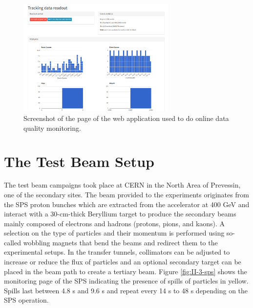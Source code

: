       \begin{figure}[h!]
        \centering
        \includegraphics[width=0.7\textwidth]{img/II-3-test-beam/app-tk.png}
        \caption{Screenshot of the page of the web application used to do online data quality monitoring.}
        \label{fig:II-3-app-tk}
      \end{figure}

  \section{The Test Beam Setup}

    The test beam campaigns took place at CERN in the North Area of Prevessin, one of the secondary sites. The beam provided to the experiments originates from the SPS proton bunches which are extracted from the accelerator at 400 GeV and interact with a 30-cm-thick Beryllium target to produce the secondary beams mainly composed of electrons and hadrons (protons, pions, and kaons). A selection on the type of particles and their momentum is performed using so-called wobbling magnets that bend the beams and redirect them to the experimental setups. In the transfer tunnels, collimators can be adjusted to increase or reduce the flux of particles and an optional secondary target can be placed in the beam path to create a tertiary beam. Figure \ref{fig:II-3-sps} shows the monitoring page of the SPS indicating the presence of spills of particles in yellow. Spills last between 4.8 s and 9.6 s and repeat every 14 s to 48 s depending on the SPS operation. \\

